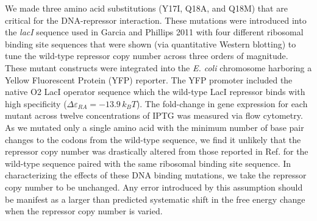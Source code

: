 We made three amino acid substitutions (Y17I, Q18A, and Q18M) that are
critical for the DNA-repressor interaction. These mutations were introduced
into the \textit{lacI} sequence used in Garcia and Phillips 2011
\cite{Garcia2011} with four different ribosomal binding site sequences that
were shown (via quantitative Western blotting)
 to tune the wild-type
repressor copy number across three orders of magnitude. These mutant
constructs were integrated into the \textit{E. coli} chromosome harboring a
Yellow Fluorescent Protein (YFP) reporter. The YFP promoter included
the native O2 LacI operator sequence which the wild-type LacI repressor binds
with high specificity ($\Delta\varepsilon_{RA} = -13.9\, k_BT$). The
fold-change in gene expression for each mutant across twelve concentrations
of IPTG was measured via flow cytometry. As we mutated only a single amino
acid with the minimum number of base pair changes to the codons from the
wild-type sequence, we find it unlikely that the repressor copy number was
drastically altered from those reported in Ref. \cite{Garcia2011} for the
wild-type sequence paired with the same ribosomal binding site sequence. In
characterizing the effects of these DNA binding mutations, we take the
repressor copy number to be unchanged. Any error introduced by this assumption
should be manifest as a larger than predicted systematic shift in the free
energy change when the repressor copy number is varied.


